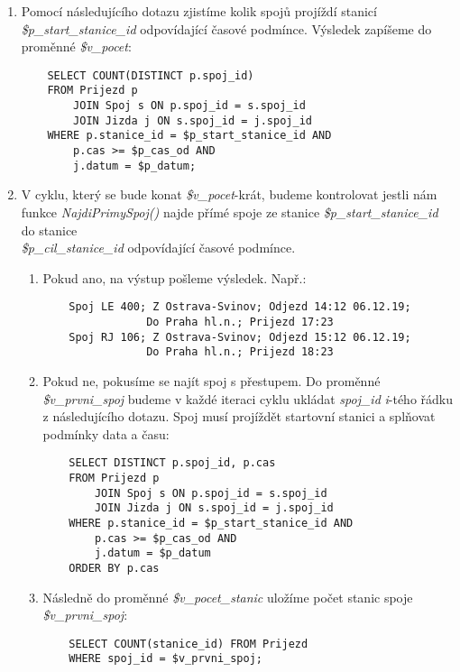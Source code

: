 \documentclass[11pt]{article}
\begin{document}
\begin{enumerate}
    \item Pomocí následujícího dotazu zjistíme kolik spojů projíždí stanicí \textit{\$p\_start\_stanice\_id} odpovídající časové podmínce. Výsledek zapíšeme do proměnné \textit{\$v\_pocet}:
    \begin{lstlisting}
    SELECT COUNT(DISTINCT p.spoj_id)
    FROM Prijezd p
        JOIN Spoj s ON p.spoj_id = s.spoj_id
        JOIN Jizda j ON s.spoj_id = j.spoj_id
    WHERE p.stanice_id = $p_start_stanice_id AND 
        p.cas >= $p_cas_od AND 
        j.datum = $p_datum;
    \end{lstlisting}
    
    \item V cyklu, který se bude konat \textit{\$v\_pocet}-krát, budeme kontrolovat jestli nám funkce \mbox{\textit{NajdiPrimySpoj()}} najde přímé spoje ze stanice \textit{\$p\_start\_stanice\_id} do stanice \\ \textit{\$p\_cil\_stanice\_id} odpovídající časové podmínce.
    
    \begin{enumerate}
        \item Pokud ano, na výstup pošleme výsledek. Např.:
        \begin{lstlisting}
    Spoj LE 400; Z Ostrava-Svinov; Odjezd 14:12 06.12.19;
                Do Praha hl.n.; Prijezd 17:23
    Spoj RJ 106; Z Ostrava-Svinov; Odjezd 15:12 06.12.19;
                Do Praha hl.n.; Prijezd 18:23
        \end{lstlisting}

        \item Pokud ne, pokusíme se najít spoj s přestupem. Do proměnné \textit{\$v\_prvni\_spoj} budeme v každé iteraci cyklu ukládat \textit{spoj\_id} \textit{i}-tého řádku z následujícího dotazu. Spoj musí projíždět startovní stanici a splňovat podmínky data a času:
        \begin{lstlisting}
    SELECT DISTINCT p.spoj_id, p.cas
    FROM Prijezd p
        JOIN Spoj s ON p.spoj_id = s.spoj_id
        JOIN Jizda j ON s.spoj_id = j.spoj_id
    WHERE p.stanice_id = $p_start_stanice_id AND
        p.cas >= $p_cas_od AND 
        j.datum = $p_datum
    ORDER BY p.cas
        \end{lstlisting}

        \item Následně do proměnné \textit{\$v\_pocet\_stanic} uložíme počet stanic spoje \textit{\$v\_prvni\_spoj}:
        \begin{lstlisting}
    SELECT COUNT(stanice_id) FROM Prijezd
    WHERE spoj_id = $v_prvni_spoj;
        \end{lstlisting}


\end{enumerate}
\end{enumerate}
\end{document}
